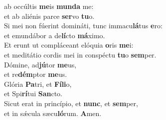 \oddverse  ab occúltis \textbf{me}is \textbf{mun}\textbf{da} me:~\*\\
\oddverse et ab aliénis parce \textbf{ser}vo \textbf{tu}o.\\
\evenverse Si mei non fúerint domináti, tunc immacu\textbf{lá}tus \textbf{e}ro:~\*\\
\evenverse et emundábor a de\textbf{lí}cto \textbf{má}ximo.\\
\oddverse Et erunt ut compláceant elóquia \textbf{o}ris \textbf{me}i:~\*\\
\oddverse et meditátio cordis mei in conspéctu \textbf{tu}o \textbf{sem}per.\\
\evenverse Dómine, ad\textbf{jú}tor \textbf{me}us,~\*\\
\evenverse et re\textbf{dém}ptor \textbf{me}us.\\
\oddverse Glória \textbf{Pa}tri, et \textbf{Fí}\textbf{li}o,~\*\\
\oddverse et Spi\textbf{rí}tui \textbf{San}cto.\\
\evenverse Sicut erat in princípio, et \textbf{nunc}, et \textbf{sem}per,~\*\\
\evenverse et in sǽcula sæcu\textbf{ló}rum. \textbf{A}men.\\
